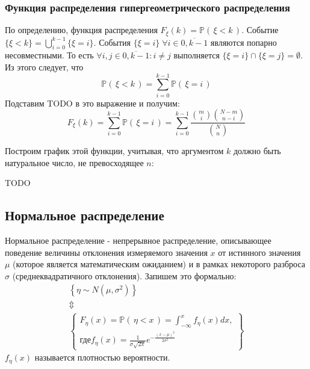 \documentclass[
  russian,
  a4paper,
  russian]{scrreprt}
\begin{document}
\hypertarget{ux444ux443ux43dux43aux446ux438ux44f-ux440ux430ux441ux43fux440ux435ux434ux435ux43bux435ux43dux438ux44f-ux433ux438ux43fux435ux440ux433ux435ux43eux43cux435ux442ux440ux438ux447ux435ux441ux43aux43eux433ux43e-ux440ux430ux441ux43fux440ux435ux434ux435ux43bux435ux43dux438ux44f}{%
\subsubsection{Функция распределения гипергеометрического
распределения}\label{ux444ux443ux43dux43aux446ux438ux44f-ux440ux430ux441ux43fux440ux435ux434ux435ux43bux435ux43dux438ux44f-ux433ux438ux43fux435ux440ux433ux435ux43eux43cux435ux442ux440ux438ux447ux435ux441ux43aux43eux433ux43e-ux440ux430ux441ux43fux440ux435ux434ux435ux43bux435ux43dux438ux44f}}

По определению, функция распределения
\(F_\xi(k) = \mathbb{P}\left(\, \xi < k \,\right)\). Событие
\(\{\xi < k\} = \bigcup\limits_{i=0}^{k-1}\{\xi=i\}\). События
\(\{\xi=i\}\; \forall i \in \overline{0, k-1}\) являются попарно
несовместными. То есть \(\forall i,j \in \overline{0, k-1}: i \neq j\)
выполняется \(\{\xi=i\}\cap\{\xi=j\}=\emptyset\). Из этого следует, что
\[\mathbb{P}\left(\, \xi < k \,\right) = \sum_{i=0}^{k-1}\mathbb{P}\left(\, \xi = i \,\right)\]
Подставим TODO в это выражение и получим: \[F_\xi(k)
= \sum_{i=0}^{k-1}\mathbb{P}\left(\, \xi = i \,\right)
= \sum_{i=0}^{k-1}\frac{\binom{m}{i}\binom{N-m}{n-i}}{\binom{N}{n}}\]

Построим график этой функции, учитывая, что аргументом \(k\) должно быть
натуральное число, не превосходящее \(n\):

TODO

\hypertarget{ux43dux43eux440ux43cux430ux43bux44cux43dux43eux435-ux440ux430ux441ux43fux440ux435ux434ux435ux43bux435ux43dux438ux435}{%
\subsection{Нормальное
распределение}\label{ux43dux43eux440ux43cux430ux43bux44cux43dux43eux435-ux440ux430ux441ux43fux440ux435ux434ux435ux43bux435ux43dux438ux435}}

Нормальное распределение - непрерывное распределение, описывающее
поведение величины отклонения измеряемого значения \(x\) от истинного
значения \(\mu\) (которое является математическим ожиданием) и в рамках
некоторого разброса \(\sigma\) (среднеквадратичного отклонения). Запишем
это формально: \[\begin{gathered}
    \left\{ \eta \sim N(\mu, \sigma^2) \right\}\\
    \Updownarrow\\
    \left\{\begin{gathered}
        F_\eta(x) = \mathbb{P}\left(\, \eta < x \,\right) = \int_{-\infty}^{x} f_\eta(x)dx,\\
        \text{где} f_\eta(x) = \frac{1}{\sigma\sqrt{2\pi}}e^{-\frac{(x-\mu)^2}{2\sigma^2}}
    \end{gathered}\right\}
\end{gathered}\] \(f_\eta(x)\) называется плотностью вероятности.
\end{document}
